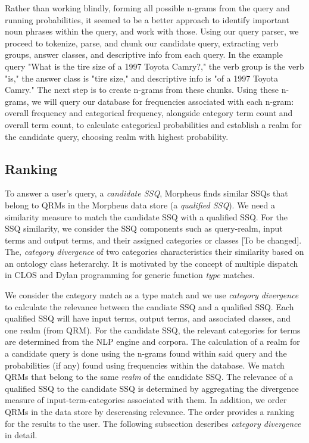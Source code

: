 
Rather than working blindly, forming all possible n-grams from the query 
and running probabilities, it seemed to be a better approach to identify 
important noun phrases within the query, and work with those. Using our 
query parser, we proceed to tokenize, parse, and chunk our candidate query, 
extracting verb groups, answer classes, and descriptive info from each query. 
In the example query "What is the tire size of a 1997 Toyota Camry?," 
the verb group is the verb "is," the answer class is "tire size," and descriptive 
info is "of a 1997 Toyota Camry." The next step is to create n-grams from these chunks. 
Using these n-grams, we will query our database for frequencies associated with 
each n-gram: overall frequency and categorical frequency, alongside category 
term count and overall term count, to calculate categorical probabilities 
and establish a realm for the candidate query, choosing realm with highest probability.




\subsection{Ranking} 
\label{sec:qrm_ranking}

To answer a user's query, a \textit{candidate
SSQ}, Morpheus finds similar SSQs that belong to QRMs in the Morpheus data store (a \textit{qualified SSQ}). We need a similarity measure to match the candidate SSQ
with a qualified SSQ. For the SSQ similarity, we
consider the SSQ components such as query-realm, input
terms and output terms, and their assigned categories or classes [To be changed]. The,
\textit{category divergence} of two categories characteristics their 
similarity based on an ontology class heterarchy. 
It is motivated by the concept of multiple
dispatch in CLOS and Dylan programming for generic function \emph{type} matches. 

We consider the category match as a type match and we use 
\emph{category divergence} to calculate the relevance between 
the candiate SSQ and a qualified SSQ. Each qualified SSQ will 
have input terms, output terms, and associated classes, and one realm (from QRM). 
For the candidate SSQ, the relevant categories for terms 
are determined from the NLP engine and corpora. The calculation of a realm 
for a candidate query is done using the n-grams found within said query 
and the probabilities (if any) found using frequencies within the database.
We match QRMs that belong to the same \emph{realm} of the candidate SSQ. 
The relevance of a qualified SSQ to the candidate SSQ is 
determined by aggregating the divergence measure of input-term-categories 
associated with them. In addition, we order QRMs in the data store 
by descreasing relevance. The order provides a ranking for the results 
to the user. The following subsection describes \emph{category divergence} 
in detail.

